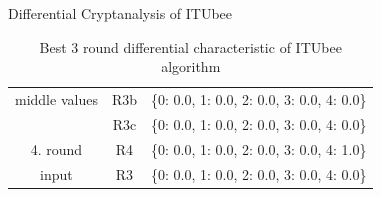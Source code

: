 \begin{section}{Differential Cryptanalysis of ITUbee}
\begin{table}[H]
\begin{tabular}{|c|c|c|}
        middle values   & R3b & \{0: 0.0, 1: 0.0, 2: 0.0, 3: 0.0, 4: 0.0\} \\
                   & R3c & \{0: 0.0, 1: 0.0, 2: 0.0, 3: 0.0, 4: 0.0\} \\
        \hline
        4. round & R4 & \{0: 0.0, 1: 0.0, 2: 0.0, 3: 0.0, 4: 1.0\} \\
        input    & R3 & \{0: 0.0, 1: 0.0, 2: 0.0, 3: 0.0, 4: 0.0\} \\
        \hline
    \end{tabular}
    \caption{Best 3 round differential characteristic of ITUbee algorithm}
    \label{tab:MILPcharDif}
\end{table}

\end{section}